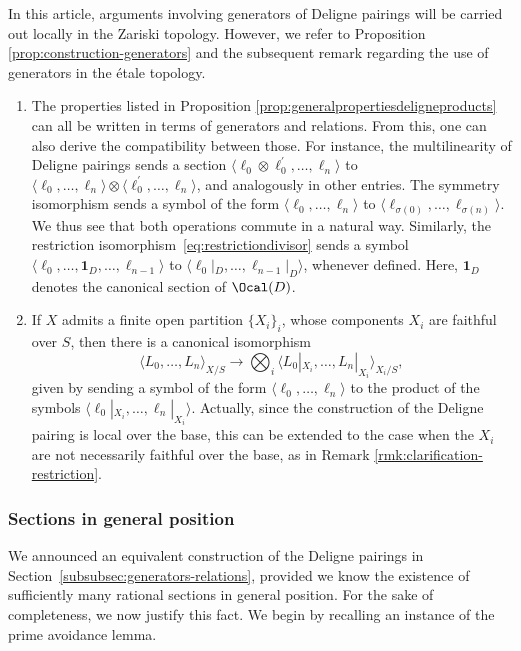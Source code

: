 In this article, arguments involving generators of Deligne pairings will be carried out locally in the Zariski topology. However, we refer to Proposition \ref{prop:construction-generators} and the subsequent remark regarding the use of generators in the étale topology.

\skpt
\begin{remark}
\begin{enumerate}
\item The properties listed in Proposition \ref{prop:generalpropertiesdeligneproducts} can all be written in terms of generators and relations. From this, one can also derive the compatibility between those. For instance, the multilinearity of Deligne pairings sends a section $\langle \ell_0\otimes\ell_{0}^{\prime}, \ldots, \ell_n \rangle $ to $\langle \ell_0, \ldots, \ell_n \rangle \otimes \langle \ell_0^{\prime}, \ldots, \ell_n \rangle$, and analogously in other entries. The symmetry isomorphism sends a symbol of the form $\langle \ell_0, \ldots, \ell_n \rangle $ to $\langle \ell_{\sigma(0)}, \ldots, \ell_{\sigma(n)} \rangle $. We thus see that both operations commute in a natural way. Similarly, the restriction isomorphism~\eqref{eq:restrictiondivisor} sends a symbol $\langle \ell_0, \ldots, \mathbf{1}_{D},\ldots, \ell_{n-1} \rangle$ to $\langle \ell_0 |_{D}, \ldots, \ell_{n-1} |_{D} \rangle$, whenever defined. Here, $\mathbf{1}_{D}$ denotes the canonical section of $\Ocal(D)$.
\item If $X$ admits a finite open partition $\lbrace X_{i}\rbrace_{i}$, whose components $X_{i}$ are faithful over $S$, then there is a canonical isomorphism
\begin{equation}\label{eq:decomposition-Deligne-pairing-partition}
\langle L_{0},\ldots, L_{n}\rangle_{X/S}\to\bigotimes_{i}\langle L_{0} |_{X_{i}},\ldots, L_{n} |_{X_{i}}\rangle_{X_{i}/S},
\end{equation}
given by sending a symbol of the form $\langle \ell_{0}, \ldots, \ell_{n} \rangle $ to the product of the symbols $\langle \ell_{0} |_{X_{i}}, \ldots, \ell_{n} |_{X_{i}} \rangle$. Actually, since the construction of the Deligne pairing is local over the base, this can be extended to the case when the $X_{i}$ are not necessarily faithful over the base, as in Remark \ref{rmk:clarification-restriction}.
\end{enumerate}
\end{remark}

\subsubsection{Sections in general position}\label{subsubsec:sections-general-position}
We announced an equivalent construction of the Deligne pairings in Section~\ref{subsubsec:generators-relations}, provided we know the existence of sufficiently many rational sections in general position. For the sake of completeness, we now justify this fact. We begin by recalling an instance of the prime avoidance lemma.

